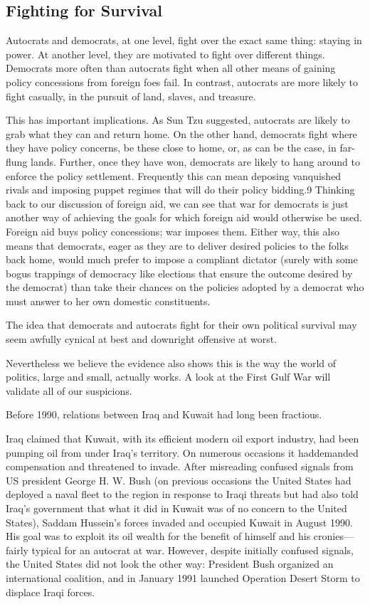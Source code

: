 \documentclass[10pt]{article}
\begin{document}
\subsection{Fighting for Survival}

{\large Autocrats and democrats, at one level, fight over the exact same thing:
staying in power. At another level, they are motivated to fight over different
things. Democrats more often than autocrats fight when all other means of gaining
policy concessions from foreign foes fail. In contrast, autocrats are more likely
to fight casually, in the pursuit of land, slaves, and treasure.}

{\large This has important implications. As Sun Tzu suggested, autocrats are
likely to grab what they can and return home. On the other hand, democrats fight
where they have policy concerns, be these close to home, or, as can be the case,
in far-flung lands. Further, once they have won, democrats are likely to hang
around to enforce the policy settlement. Frequently this can mean deposing
vanquished rivals and imposing puppet regimes that will do their policy bidding.9
Thinking back to our discussion of foreign aid, we can see that war for democrats
is just another way of achieving the goals for which foreign aid would otherwise
be used. Foreign aid buys policy concessions; war imposes them. Either way, this
also means that democrats, eager as they are to deliver desired policies to the
folks back home, would much prefer to impose a compliant dictator (surely with
some bogus trappings of democracy like elections that ensure the outcome desired
by the democrat) than take their chances on the policies adopted by a democrat
who must answer to her own domestic constituents.}

{\large The idea that democrats and autocrats fight for their own political
survival may seem awfully cynical at best and downright offensive at worst.}

{\large Nevertheless we believe the evidence also shows this is the way the
world of politics, large and small, actually works. A look at the First Gulf War
will validate all of our suspicions.}

{\large Before 1990, relations between Iraq and Kuwait had long been fractious.}

{\large Iraq claimed that Kuwait, with its efficient modern oil export industry,
had been pumping oil from under Iraq's territory. On numerous occasions it
haddemanded compensation and threatened to invade. After misreading confused
signals from US president George H. W. Bush (on previous occasions the United
States had deployed a naval fleet to the region in response to Iraqi threats but
had also told Iraq's government that what it did in Kuwait was of no concern to
the United States), Saddam Hussein's forces invaded and occupied Kuwait in August
1990. His goal was to exploit its oil wealth for the benefit of himself and his
cronies---fairly typical for an autocrat at war. However, despite initially
confused signals, the United States did not look the other way: President Bush
organized an international coalition, and in January 1991 launched Operation
Desert Storm to displace Iraqi forces.}
\end{document}
